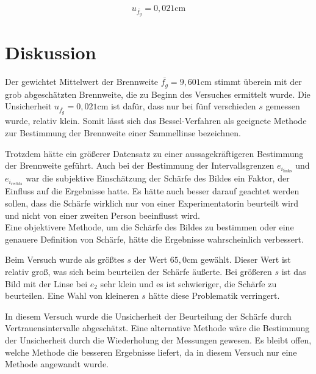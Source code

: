 \documentclass[a4paper,12pt]{article}
\begin{document}
\begin{equation*}
    u_{\bar{f_g}} = 0,021\mathrm{cm}
\end{equation*}


\section{Diskussion}

Der gewichtet Mittelwert der Brennweite $\bar{f_g} = 9,601\mathrm{cm}$ stimmt überein mit der grob abgeschätzten
Brennweite, die zu Beginn des Versuches ermittelt wurde. Die Unsicherheit $u_{\bar{f_g}} = 0,021\mathrm{cm}$ ist
dafür, dass nur bei fünf verschieden $s$ gemessen wurde, relativ klein.
Somit lässt sich das Bessel-Verfahren als geeignete Methode zur Bestimmung der Brennweite einer Sammellinse
bezeichnen.

Trotzdem hätte ein größerer Datensatz zu einer aussagekräftigeren Bestimmung der Brennweite geführt.
Auch bei der Bestimmung der Intervallsgrenzen $e_{i_\mathrm{links}}$ und $e_{i_\mathrm{rechts}}$ war
die subjektive Einschätzung der Schärfe des Bildes ein Faktor, der Einfluss auf die Ergebnisse hatte.
Es hätte auch besser darauf geachtet werden sollen, dass die Schärfe wirklich nur von einer
Experimentatorin beurteilt wird und nicht von einer zweiten Person beeinflusst wird.\\
Eine objektivere Methode, um die Schärfe des Bildes zu bestimmen oder eine genauere Definition von
Schärfe, hätte die Ergebnisse wahrscheinlich verbessert.

Beim Versuch wurde als größtes $s$ der Wert $65,0\mathrm{cm}$ gewählt. Dieser Wert ist relativ groß,
was sich beim beurteilen der Schärfe äußerte. Bei größeren $s$ ist das Bild mit der Linse bei $e_2$
sehr klein und es ist schwieriger, die Schärfe zu beurteilen. Eine Wahl von kleineren $s$ hätte
diese Problematik verringert.

In diesem Versuch wurde die Unsicherheit der Beurteilung der Schärfe durch Vertrauensintervalle
abgeschätzt. Eine alternative Methode wäre die Bestimmung der Unsicherheit durch die Wiederholung
der Messungen gewesen. Es bleibt offen, welche Methode die besseren Ergebnisse liefert, da in diesem
Versuch nur eine Methode angewandt wurde.
\end{document}
